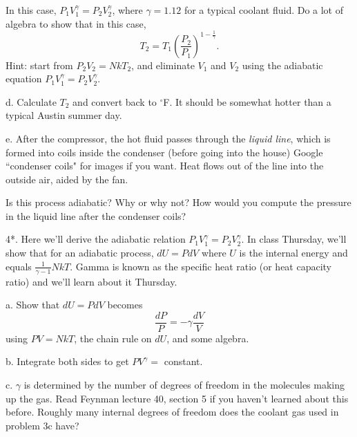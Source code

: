 \documentclass[12pt]{article}
\begin{document}
In this case, $P_1V_1^\gamma=P_2V_2^\gamma$, where $\gamma = 1.12$ for a typical coolant fluid. Do a lot of algebra to show that in this case, 
\begin{equation}
    T_2 = T_1 \left( \frac{P_2}{P_1} \right)^{1-\frac{1}{\gamma}}. 
\end{equation}
Hint: start from $P_2V_2=NkT_2$, and eliminate $V_1$ and $V_2$ using the adiabatic equation $P_1V_1^\gamma=P_2V_2^\gamma$.

d. Calculate $T_2$ and convert back to $^{\circ}$F. It should be somewhat hotter than a typical Austin summer day.  

e. After the compressor, the hot fluid passes through the \textit{liquid line}, which is formed into coils inside the condenser (before going into the house) Google ``condenser coils" for images if you want. Heat flows out of the line into the outside air, aided by the fan. 

Is this process adiabatic? Why or why not? How would you compute the pressure in the liquid line after the condenser coils?


4*. Here we'll derive the adiabatic relation $P_1V_1^\gamma=P_2V_2^\gamma$. In class Thursday, we'll show that for an adiabatic process, $dU = PdV$ where $U$ is the internal energy and equals $\frac{1}{\gamma-1}NkT$. Gamma is known as the specific heat ratio (or heat capacity ratio) and we'll learn about it Thursday.

a. Show that $dU = PdV$ becomes 
\begin{equation}
    \frac{dP}{P} = - \gamma\frac{dV}{V}
\end{equation}
using $PV=NkT$, the chain rule on $dU$, and some algebra. 

b. Integrate both sides to get $PV^\gamma=$ constant. 

c. $\gamma$ is determined by the number of degrees of freedom in the molecules making up the gas. Read Feynman lecture 40, section 5 if you haven't learned about this before. Roughly many internal degrees of freedom does the coolant gas used in problem 3c have?
\end{document}
